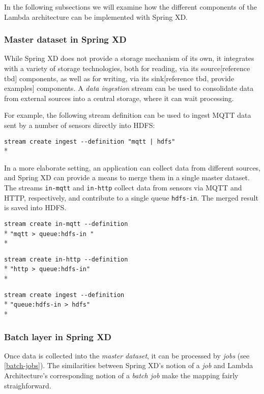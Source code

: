 In the following subsections we will examine how the different components of the Lambda architecture can be implemented with Spring XD.

\subsubsection {Master dataset in Spring XD}

While Spring XD does not provide a storage mechanism of its own, it integrates with a variety of storage technologies, both for reading, 
via its source[reference tbd] components, as well as for writing, via its sink[reference tbd, provide examples] components. A \emph{data ingestion} stream can be used to consolidate data from external sources into a central storage, where it can wait processing.

For example, the following stream definition can be used to ingest MQTT data sent by a number of sensors directly into HDFS:

\verb;stream create ingest --definition "mqtt | hdfs";\\*

In a more elaborate setting, an application can collect data from different sources, and Spring XD can provide a means to merge them in a single master dataset. The streams \texttt{in-mqtt} and \texttt{in-http} collect data from sensors via MQTT and HTTP, respectively, and contribute to a single queue \texttt{hdfs-in}. The merged result is saved into HDFS.

\verb;stream create in-mqtt --definition ;\\*
\verb;"mqtt > queue:hdfs-in ";\\*

\verb;stream create in-http --definition  ;\\*
\verb;"http > queue:hdfs-in";\\*

\verb;stream create ingest --definition  ;\\*
\verb;"queue:hdfs-in > hdfs";\\*

\subsubsection {Batch layer in Spring XD}

Once data is collected into the \emph{master dataset}, it can be processed by \emph{jobs} (see \ref{batch-jobs}). The similarities between Spring XD's notion of a \emph{job} and Lambda Architecture's corresponding notion of a \emph{batch job} make the mapping fairly straighforward.

